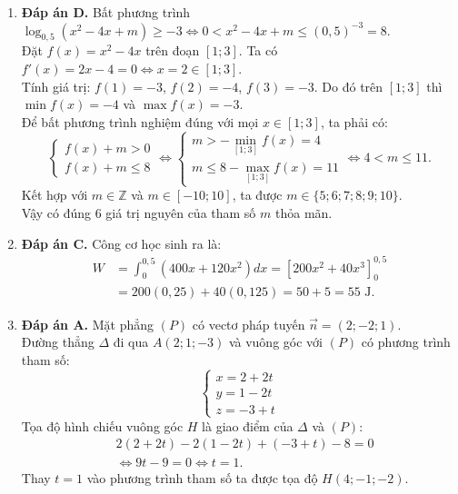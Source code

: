 \documentclass[12pt,a4paper]{article}
\begin{document}
\begin{enumerate}[label=\textbf{Câu \arabic*:}, leftmargin=*]
\item \textbf{Đáp án D.}
Bất phương trình $\log_{0{,}5}(x^2 - 4x + m) \ge -3 \iff 0 < x^2 - 4x + m \le (0{,}5)^{-3} = 8$.\\
Đặt $f(x) = x^2 - 4x$ trên đoạn $[1; 3]$. Ta có $f'(x) = 2x - 4 = 0 \iff x = 2 \in [1; 3]$.\\
Tính giá trị: $f(1) = -3$, $f(2) = -4$, $f(3) = -3$. Do đó trên $[1; 3]$ thì $\min f(x) = -4$ và $\max f(x) = -3$.\\
Để bất phương trình nghiệm đúng với mọi $x \in [1; 3]$, ta phải có:
$$\begin{cases} f(x) + m > 0 \\ f(x) + m \le 8 \end{cases} \iff \begin{cases} m > -\min_{[1; 3]} f(x) = 4 \\ m \le 8 - \max_{[1; 3]} f(x) = 11 \end{cases} \iff 4 < m \le 11.$$
Kết hợp với $m \in \mathbb{Z}$ và $m \in [-10; 10]$, ta được $m \in \{5; 6; 7; 8; 9; 10\}$.\\
Vậy có đúng $6$ giá trị nguyên của tham số $m$ thỏa mãn.

\item \textbf{Đáp án C.}
Công cơ học sinh ra là:
\begin{align*}
W &= \int_0^{0{,}5} (400x + 120x^2) dx = \left[ 200x^2 + 40x^3 \right]_0^{0{,}5} \\
&= 200(0{,}25) + 40(0{,}125) = 50 + 5 = 55\text{ J}.
\end{align*}

\item \textbf{Đáp án A.}
Mặt phẳng $(P)$ có vectơ pháp tuyến $\vec{n} = (2; -2; 1)$.\\
Đường thẳng $\Delta$ đi qua $A(2; 1; -3)$ và vuông góc với $(P)$ có phương trình tham số:
$$\begin{cases} x = 2 + 2t \\ y = 1 - 2t \\ z = -3 + t \end{cases}$$
Tọa độ hình chiếu vuông góc $H$ là giao điểm của $\Delta$ và $(P)$:
\begin{align*}
&2(2 + 2t) - 2(1 - 2t) + (-3 + t) - 8 = 0 \\
&\iff 9t - 9 = 0 \iff t = 1.
\end{align*}
Thay $t = 1$ vào phương trình tham số ta được tọa độ $H(4; -1; -2)$.


\end{enumerate}
\end{document}
